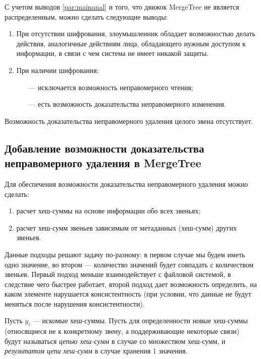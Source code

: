 С учетом выводов \ref{par:mainanal} и того, что движок MergeTree не является распределенным, можно сделать следующие выводы:
\begin{enumerate}
	\item При отсутствии шифрования, злоумышленник обладает возможностью делать действия, аналогичные действиям лица, обладающего нужным доступом к информации, в связи с чем система не имеет никакой защиты.
	\item При наличии шифрования:
	\begin{itemize}
		\item [---] исключается возможность неправомерного чтения;
		\item [---] есть возможность доказательства неправомерного изменения.
	\end{itemize}
\end{enumerate}

Возможность доказательства неправомерного удаления целого звена отсутствует.

\subsection{Добавление возможности доказательства неправомерного удаления в MergeTree}

Для обеспечения возможности доказательства неправомерного удаления можно сделать:
\begin{enumerate}
	\item расчет хеш-суммы на основе информации обо всех звеньях;
	\item расчет хеш-сумм звеньев зависимым от метаданных (хеш-сумм) других звеньев.
\end{enumerate}

Данные подходы решают задачу по-разному: в первом случае мы будем иметь одно значение, во втором --- количество значений будет совпадать с количеством звеньев. Первый подход меньше взаимодействует с файловой системой, в следствие чего быстрее работает, второй подход дает возможность определить, на каком элементе нарушается консистентность (при условии, что данные не будут меняться после нарушения консистентности).

Пусть $y_i$ --- искомые хеш-суммы. Пусть для определенности новые хеш-суммы (относящиеся не к конкретному звену, а поддерживающие некоторые связи) будут называться \textit{цепью хеш-сумм} в случае со множеством хеш-сумм, и \textit{результатом цепи хеш-сумм} в случае хранения 1 значения.

\pagebreak

